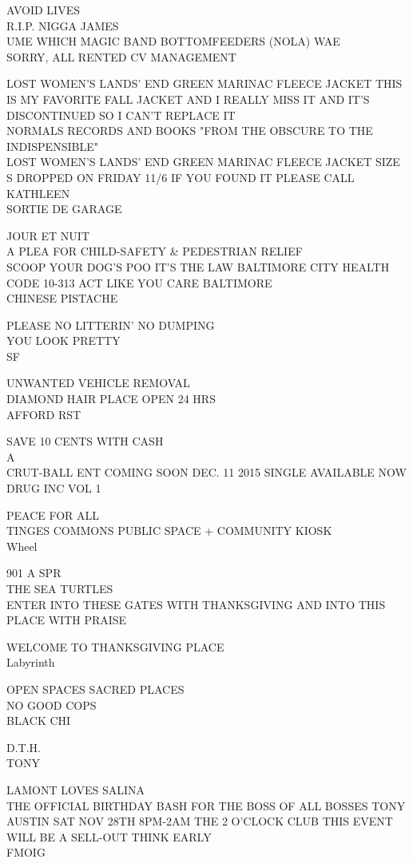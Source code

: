 \documentclass[10pt,letterpaper]{article}
\begin{document}
AVOID LIVES\\
R.I.P. NIGGA JAMES\\
UME WHICH MAGIC BAND BOTTOMFEEDERS (NOLA) WAE\\
SORRY, ALL RENTED CV MANAGEMENT

LOST WOMEN'S LANDS' END GREEN MARINAC FLEECE JACKET THIS IS MY FAVORITE FALL JACKET AND I REALLY MISS IT AND IT'S DISCONTINUED SO I CAN'T REPLACE IT\\
NORMALS RECORDS AND BOOKS "FROM THE OBSCURE TO THE INDISPENSIBLE"\\
LOST WOMEN'S LANDS' END GREEN MARINAC FLEECE JACKET SIZE S DROPPED ON FRIDAY 11/6 IF YOU FOUND IT PLEASE CALL KATHLEEN\\
SORTIE DE GARAGE

JOUR ET NUIT\\
A PLEA FOR CHILD{-}SAFETY \& PEDESTRIAN RELIEF\\
SCOOP YOUR DOG'S POO IT'S THE LAW BALTIMORE CITY HEALTH CODE 10{-}313 ACT LIKE YOU CARE BALTIMORE\\
CHINESE PISTACHE

PLEASE NO LITTERIN' NO DUMPING\\
YOU LOOK PRETTY\\
SF

UNWANTED VEHICLE REMOVAL\\
DIAMOND HAIR PLACE OPEN 24 HRS\\
AFFORD RST

SAVE 10 CENTS WITH CASH\\
A\\
CRUT{-}BALL ENT COMING SOON DEC. 11 2015 SINGLE AVAILABLE NOW DRUG INC VOL 1

PEACE FOR ALL\\
TINGES COMMONS PUBLIC SPACE + COMMUNITY KIOSK\\
Wheel

901 A SPR\\
THE SEA TURTLES\\
ENTER INTO THESE GATES WITH THANKSGIVING AND INTO THIS PLACE WITH PRAISE

WELCOME TO THANKSGIVING PLACE\\
Labyrinth

OPEN SPACES SACRED PLACES\\
NO GOOD COPS\\
BLACK CHI

D.T.H.\\
TONY

LAMONT LOVES SALINA\\
THE OFFICIAL BIRTHDAY BASH FOR THE BOSS OF ALL BOSSES TONY AUSTIN SAT NOV 28TH 8PM{-}2AM THE 2 O'CLOCK CLUB THIS EVENT WILL BE A SELL{-}OUT THINK EARLY\\
FMOIG
\end{document}
